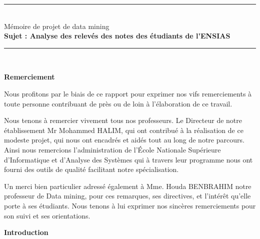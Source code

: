 \documentclass{article}
\begin{document}
    \begin{center}
        \rule{1.05\textwidth}{2pt}\\
            \Huge Mémoire de projet de data mining\\
            \huge \textbf{Sujet : Analyse des relevés des notes des étudiants de l'ENSIAS}\\
        \rule{1.05\textwidth}{2pt}\\
    \thispagestyle{empty}
    \end{center}
\newpage
\thispagestyle{plain} %
\thispagestyle{empty}
\mbox{}
    \newpage
    \begin{center}
    \Large \textbf{Remerciement}
    \end{center}
    \begin{spacing}{2}
    \par Nous profitons par le biais de ce rapport pour exprimer nos vifs remerciements à toute personne contribuant de près ou de loin à l’élaboration de ce travail.
    \par Nous tenons à remercier vivement tous nos professeurs. Le Directeur de notre établissement Mr Mohammed HALIM, qui ont contribué à la réalisation de ce modeste projet, qui nous ont encadrés et aidés tout au long de notre parcours. Ainsi nous remercions l’administration de l’École Nationale Supérieure d’Informatique et d’Analyse des Systèmes qui à travers leur programme nous ont fourni des outils de qualité facilitant notre spécialisation. 
    \par Un merci bien particulier adressé également à Mme. Houda BENBRAHIM notre professeur  de Data mining, pour ces remarques, ses directives, et l’intérêt qu’elle porte à ses étudiants. Nous tenons à lui exprimer nos sincères remerciements pour son suivi et ses orientations.
    \end{spacing}
    \newpage 
    \tableofcontents
    \newpage 
    \listoffigures
    \listoftables
    \newpage
    \begin{center}
    \Large \textbf{Introduction}
    \end{center}
\end{document}

